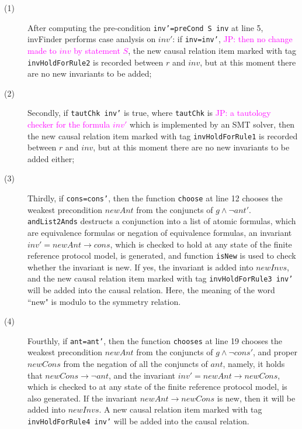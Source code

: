 \documentclass{llncs}
\newcommand\JP[1]{\textcolor{magenta}{JP: #1}}
\begin{document}
\begin{description}
\item[(1)] After computing the pre-condition {\tt inv'=preCond~S~inv} at line 5,
{\sf invFinder} performs case analysis on $inv'$: if {\tt inv=inv'},
\JP{then no change made to $inv$ by statement $S$},
the new causal relation item marked with tag {\tt invHoldForRule2} is recorded between $r$ and $inv$,
but at this moment there are no new invariants to be added;

\item[(2)] Secondly, if {\tt tautChk inv'} is true, where {\tt tautChk} is \JP{a tautology checker for the formula $inv'$}
which is implemented by an SMT solver,
then the new causal relation item marked with tag {\tt invHoldForRule1} is recorded between $r$ and $inv$,
but at this moment there are no new invariants to be added either;

 \item[(3)] Thirdly, if {\tt cons=cons'},
 then the function {\tt choose} at line 12 chooses the weakest precondition $newAnt$
 from the conjuncts of  $g \wedge \neg  ant'$.
 {\tt andList2Ands} destructs a conjunction into a list of atomic formulas,
 which are equivalence formulas or negation of equivalence formulas,
 an invariant $inv'=newAnt \longrightarrow cons$,
 which is checked to hold at any state of the finite reference protocol model,
 is generated, and function {\tt isNew} is used to check whether the invariant is new.
 If yes, the invariant is  added into $newInvs$,
 and the new causal relation item marked with tag {\tt invHoldForRule3 inv'} will be added into the causal relation.
Here, the meaning of the word ``new" is modulo to the symmetry relation.

  \item[(4)] Fourthly, if {\tt ant=ant'}, then the function {\tt chooses} at line 19 chooses
  the weakest precondition $newAnt$ from the conjuncts of
   $g \wedge \neg  cons'$, and proper $newCons$ from the negation of all the conjuncts of $ant$,
   namely, it holds that $newCons \longrightarrow \neg ant$,
   and the invariant  $inv'=newAnt \longrightarrow newCons$,
   which is checked to  at any state of the finite reference protocol model,  is also generated.
   If the invariant $newAnt \longrightarrow newCons$ is new, then it will be added into $newInvs$.
   A new causal relation item marked with tag {\tt invHoldForRule4 inv'} will be added into the causal
   relation.


\end{description}
\end{document}
